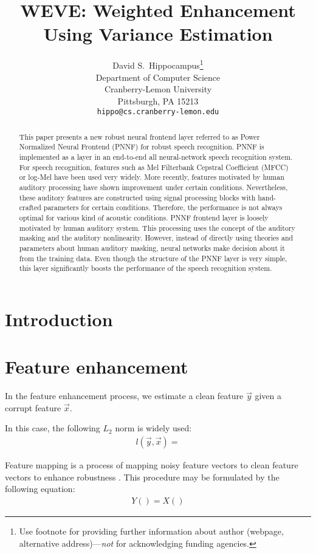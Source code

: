 \documentclass{article}
\title{WEVE: Weighted Enhancement Using Variance Estimation}
\author{
  David S.~Hippocampus\thanks{Use footnote for providing further
    information about author (webpage, alternative
    address)---\emph{not} for acknowledging funding agencies.} \\
  Department of Computer Science\\
  Cranberry-Lemon University\\
  Pittsburgh, PA 15213 \\
  \texttt{hippo@cs.cranberry-lemon.edu} \\
}
\begin{document}

\maketitle

\begin{abstract}
This paper presents a new robust neural frontend layer referred to as Power
Normalized Neural Frontend (PNNF) for robust speech recognition. PNNF
is implemented as a layer in an end-to-end all neural-network speech 
recognition system. For speech recognition, features such as Mel Filterbank
Cepstral Coefficient (MFCC) or log-Mel have been used very widely.
More recently, features motivated by human auditory processing have shown
improvement under certain conditions. Nevertheless, these auditory
features are constructed using signal processing blocks with hand-crafted
parameters for certain conditions. Therefore, the performance is not
always optimal for various kind of acoustic conditions.
 PNNF frontend layer is loosely motivated by human auditory system.
This processing uses the concept of the auditory masking and the auditory nonlinearity.
However, instead of directly using theories and parameters about human auditory masking,
neural networks make decision about it from the training data.
Even though the structure of the PNNF layer is very simple, this layer
significantly boosts the performance of the speech recognition system.
\end{abstract}

\section{Introduction}

\section{Feature enhancement}


In the feature enhancement process, we estimate a clean feature 
$\vec{y}$ given a corrupt feature $\vec{x}$.

In this case, the following $L_2$ norm is widely used:
\begin{align}
  l(\vec{y}, \vec{x}) = 
\end{align}




Feature mapping is a process of mapping noisy feature vectors
to clean feature vectors to enhance robustness
\cite{C_Kim_ASRU_2009_1, k_han_taslp_2015_00, k_han_icassp_2014_00}.
This procedure may be formulated by the following equation:
\begin{align}
  Y() = X()
\end{align}
\end{document}
